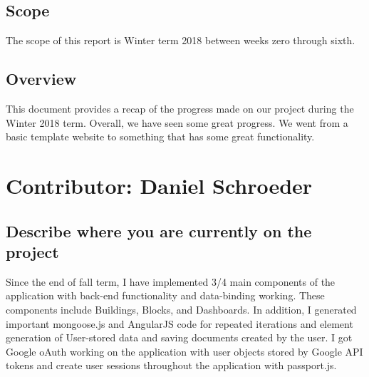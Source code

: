 \documentclass[letterpaper,10pt,serif,draftclsnofoot,onecolumn,compsoc,titlepage]{IEEEtran}
\begin{document}
\subsection{Scope}
The scope of this report is Winter term 2018 between weeks zero through sixth.
\subsection{Overview}
This document provides a recap of the progress made on our project during the Winter 2018 term. Overall, we have seen some great progress. We went from a basic template website to something that has some great functionality. \\

\section{Contributor: Daniel Schroeder} 
\subsection{Describe where you are currently on the project}
Since the end of fall term, I have implemented 3/4 main components of the application with back-end functionality and data-binding working. These components include Buildings, Blocks, and Dashboards. In addition, I generated important mongoose.js and AngularJS code for repeated iterations and element generation of User-stored data and saving documents created by the user. I got Google oAuth working on the application with user objects stored by Google API tokens and create user sessions throughout the application with passport.js. 
\end{document}
